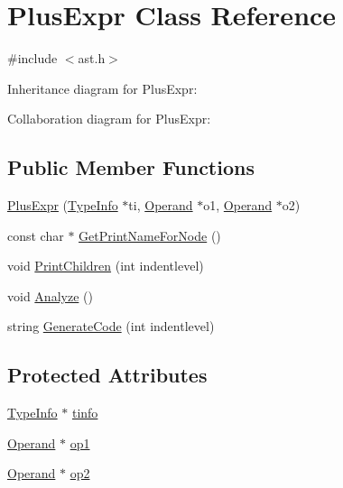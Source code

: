 \hypertarget{class_plus_expr}{}\section{Plus\+Expr Class Reference}
\label{class_plus_expr}


{\ttfamily \#include $<$ast.\+h$>$}



Inheritance diagram for Plus\+Expr\+:


Collaboration diagram for Plus\+Expr\+:
\subsection*{Public Member Functions}
\begin{DoxyCompactItemize}
\item 
\hyperlink{class_plus_expr_ac8de95e7dc894bbcf92b19e1a99e7bb6}{Plus\+Expr} (\hyperlink{class_type_info}{Type\+Info} $\ast$ti, \hyperlink{class_operand}{Operand} $\ast$o1, \hyperlink{class_operand}{Operand} $\ast$o2)
\item 
const char $\ast$ \hyperlink{class_plus_expr_a37b598c579f8de2b61cd93cc5d28c973}{Get\+Print\+Name\+For\+Node} ()
\item 
void \hyperlink{class_plus_expr_a5ff2d74c543d3dcda4aefb81126e8f51}{Print\+Children} (int indentlevel)
\item 
void \hyperlink{class_plus_expr_aaf2180ee0d3019f23212104587c0cbb9}{Analyze} ()
\item 
string \hyperlink{class_plus_expr_ab8ade880fd47a7a0142c21439f83ca10}{Generate\+Code} (int indentlevel)
\end{DoxyCompactItemize}
\subsection*{Protected Attributes}
\begin{DoxyCompactItemize}
\item 
\hyperlink{class_type_info}{Type\+Info} $\ast$ \hyperlink{class_plus_expr_af48b5356573a1592815d552f86551745}{tinfo}
\item 
\hyperlink{class_operand}{Operand} $\ast$ \hyperlink{class_plus_expr_ae9a51590eac204790685a49a0b67aaa5}{op1}
\item 
\hyperlink{class_operand}{Operand} $\ast$ \hyperlink{class_plus_expr_a14d789b288ad156fd5b8908dbca3f62b}{op2}
\end{DoxyCompactItemize}


